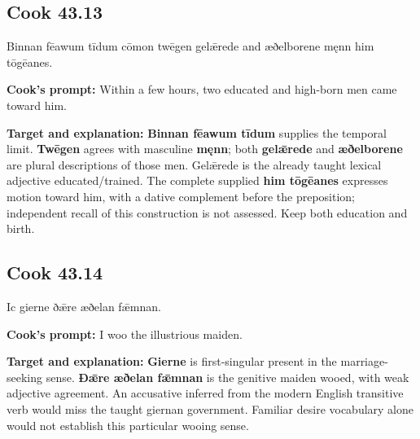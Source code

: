 \par\begin{minipage}{\linewidth}\raggedright
\subsection*{Cook 43.13}

Binnan fēawum tīdum cōmon twēgen gelǣrede and æðelborene męnn him tōgēanes.

\textbf{Cook's prompt:} Within a few hours, two educated and high-born men came toward him.

\textbf{Target and explanation:} \textbf{Binnan fēawum tīdum} supplies the temporal limit. \textbf{Twēgen} agrees with masculine \textbf{męnn}; both \textbf{gelǣrede} and \textbf{æðelborene} are plural descriptions of those men. Gelǣrede is the already taught lexical adjective educated/\allowbreak{}trained. The complete supplied \textbf{him tōgēanes} expresses motion toward him, with a dative complement before the preposition; independent recall of this construction is not assessed. Keep both education and birth.

\end{minipage}\par\addvspace{4pt}

\par\begin{minipage}{\linewidth}\raggedright
\subsection*{Cook 43.14}

Ic gierne ðǣre æðelan fǣmnan.

\textbf{Cook's prompt:} I woo the illustrious maiden.

\textbf{Target and explanation:} \textbf{Gierne} is first-singular present in the marriage-seeking sense. \textbf{Ðǣre æðelan fǣmnan} is the genitive maiden wooed, with weak adjective agreement. An accusative inferred from the modern English transitive verb would miss the taught giernan government. Familiar desire vocabulary alone would not establish this particular wooing sense.

\end{minipage}\par\addvspace{4pt}


